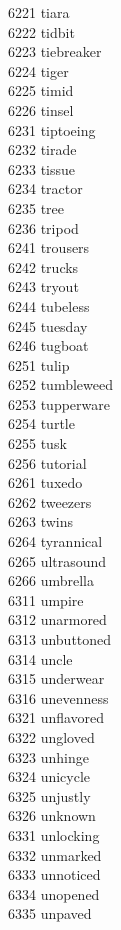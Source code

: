 6221 tiara \\
6222 tidbit \\
6223 tiebreaker \\
6224 tiger \\
6225 timid \\
6226 tinsel \\
6231 tiptoeing \\
6232 tirade \\
6233 tissue \\
6234 tractor \\
6235 tree \\
6236 tripod \\
6241 trousers \\
6242 trucks \\
6243 tryout \\
6244 tubeless \\
6245 tuesday \\
6246 tugboat \\
6251 tulip \\
6252 tumbleweed \\
6253 tupperware \\
6254 turtle \\
6255 tusk \\
6256 tutorial \\
6261 tuxedo \\
6262 tweezers \\
6263 twins \\
6264 tyrannical \\
6265 ultrasound \\
6266 umbrella \\
6311 umpire \\
6312 unarmored \\
6313 unbuttoned \\
6314 uncle \\
6315 underwear \\
6316 unevenness \\
6321 unflavored \\
6322 ungloved \\
6323 unhinge \\
6324 unicycle \\
6325 unjustly \\
6326 unknown \\
6331 unlocking \\
6332 unmarked \\
6333 unnoticed \\
6334 unopened \\
6335 unpaved \\
